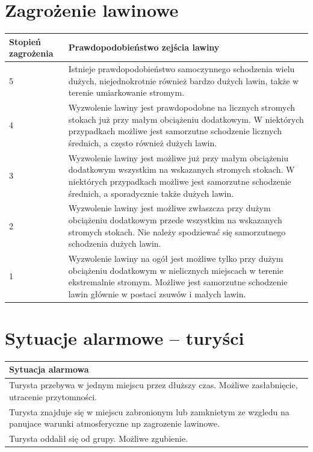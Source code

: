 \documentclass[a4paper,12pt]{article}
\begin{document}
\section{Zagrożenie lawinowe}
\begin{center}
    \begin{longtable}{ | l | p{10cm} |}
    \hline
    \textbf{Stopień zagrożenia} & \textbf{Prawdopodobieństwo zejścia lawiny}\\ \hline
    5 & Istnieje prawdopodobieństwo samoczynnego schodzenia wielu dużych, niejednokrotnie
również bardzo dużych lawin, także w terenie
umiarkowanie stromym. \\\hline
	4 & Wyzwolenie lawiny jest prawdopodobne na
licznych stromych stokach już przy małym
obciążeniu dodatkowym. W niektórych
przypadkach możliwe jest samorzutne
schodzenie licznych średnich, a często
również dużych lawin.\\\hline
	3 & Wyzwolenie lawiny jest możliwe już przy
małym obciążeniu dodatkowym wszystkim na
wskazanych stromych stokach. W niektórych
przypadkach możliwe jest samorzutne
schodzenie średnich, a sporadycznie także
dużych lawin.\\\hline
	2 & Wyzwolenie lawiny jest możliwe zwłaszcza
przy dużym obciążeniu dodatkowym przede
wszystkim na wskazanych stromych stokach.
Nie należy spodziewać się samorzutnego
schodzenia dużych lawin.\\\hline
	1 & Wyzwolenie lawiny na ogół jest możliwe tylko
przy dużym obciążeniu dodatkowym w
nielicznych miejscach w terenie ekstremalnie
stromym. Możliwe jest samorzutne schodzenie
lawin głównie w postaci zsuwów i małych
lawin. \\\hline
    \end{longtable}
\end{center}
\newpage
\section{Sytuacje alarmowe -- turyści}
\begin{center}
\begin{longtable}{ | p{15cm} | }
\hline
	\textbf{Sytuacja alarmowa}\\\hline
	Turysta przebywa w jednym miejscu przez
dłuższy czas. Możliwe zasłabnięcie, utracenie
przytomności.\\\hline
	Turysta znajduje się w miejscu zabronionym lub
zamknietym ze wzgledu na panujace warunki
atmosferyczne np zagrozenie lawinowe.\\\hline
	Turysta oddalił się od grupy. Możliwe zgubienie.\\\hline
\end{longtable}
\end{center}
\newpage
\end{document}
